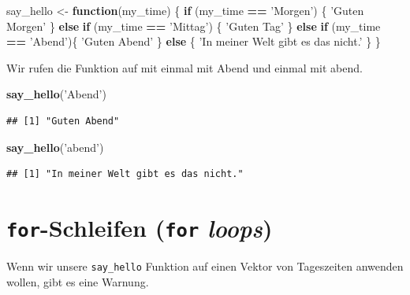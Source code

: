 \documentclass[]{book}
\newenvironment{Shaded}{\begin{snugshade}}{\end{snugshade}}
\newcommand{\ControlFlowTok}[1]{\textcolor[rgb]{0.13,0.29,0.53}{\textbf{#1}}}
\newcommand{\KeywordTok}[1]{\textcolor[rgb]{0.13,0.29,0.53}{\textbf{#1}}}
\newcommand{\NormalTok}[1]{#1}
\newcommand{\OperatorTok}[1]{\textcolor[rgb]{0.81,0.36,0.00}{\textbf{#1}}}
\newcommand{\StringTok}[1]{\textcolor[rgb]{0.31,0.60,0.02}{#1}}
\begin{document}
\begin{Shaded}
\begin{Highlighting}[]
\NormalTok{say_hello <-}\StringTok{ }\ControlFlowTok{function}\NormalTok{(my_time) \{}
  \ControlFlowTok{if}\NormalTok{ (my_time }\OperatorTok{==}\StringTok{ 'Morgen'}\NormalTok{) \{}
    \StringTok{'Guten Morgen'}
\NormalTok{  \} }\ControlFlowTok{else} \ControlFlowTok{if}\NormalTok{ (my_time }\OperatorTok{==}\StringTok{ 'Mittag'}\NormalTok{) \{}
    \StringTok{'Guten Tag'}
\NormalTok{  \} }\ControlFlowTok{else} \ControlFlowTok{if}\NormalTok{ (my_time }\OperatorTok{==}\StringTok{ 'Abend'}\NormalTok{)\{}
    \StringTok{'Guten Abend'}
\NormalTok{  \} }\ControlFlowTok{else}\NormalTok{ \{}
    \StringTok{'In meiner Welt gibt es das nicht.'}
\NormalTok{  \}}
\NormalTok{\}}
\end{Highlighting}
\end{Shaded}

Wir rufen die Funktion auf mit einmal mit Abend und einmal mit abend.

\begin{Shaded}
\begin{Highlighting}[]
\KeywordTok{say_hello}\NormalTok{(}\StringTok{'Abend'}\NormalTok{)}
\end{Highlighting}
\end{Shaded}

\begin{verbatim}
## [1] "Guten Abend"
\end{verbatim}

\begin{Shaded}
\begin{Highlighting}[]
\KeywordTok{say_hello}\NormalTok{(}\StringTok{'abend'}\NormalTok{)}
\end{Highlighting}
\end{Shaded}

\begin{verbatim}
## [1] "In meiner Welt gibt es das nicht."
\end{verbatim}

\hypertarget{for-schleifen-for-loops}{%
\section{\texorpdfstring{\texttt{for}-Schleifen (\texttt{for} \emph{loops})}{for-Schleifen (for loops)}}\label{for-schleifen-for-loops}}

Wenn wir unsere \texttt{say\_hello} Funktion auf einen Vektor von Tageszeiten anwenden wollen, gibt es eine Warnung.
\end{document}

